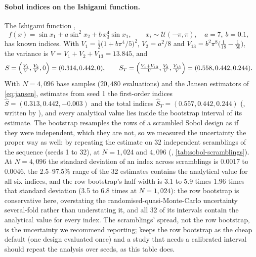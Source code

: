\paragraph{Sobol indices on the Ishigami function.} The Ishigami function
\citep{ishigami1990importance},
\begin{equation}
  f(x) = \sin x_1 + a \sin^2 x_2 + b\, x_3^4 \sin x_1, \qquad x_i \sim
  \mathcal{U}(-\pi, \pi), \quad a = 7,\ b = 0.1,
\end{equation}
has known indices. With $V_1 = \tfrac12\bigl(1 + b\pi^4/5\bigr)^2$, $V_2 = a^2/8$ and
$V_{13} = b^2\pi^8\bigl(\tfrac{1}{18} - \tfrac{1}{50}\bigr)$, the variance is $V = V_1 + V_2 +
V_{13} = 13.845$, and
\begin{equation}
  S = \Bigl(\tfrac{V_1}{V}, \tfrac{V_2}{V}, 0\Bigr) = (0.314, 0.442, 0), \qquad
  S_T = \Bigl(\tfrac{V_1 + V_{13}}{V}, \tfrac{V_2}{V}, \tfrac{V_{13}}{V}\Bigr)
  = (0.558, 0.442, 0.244).
\end{equation}
With $N = 4{,}096$ base samples ($20{,}480$ evaluations) and the Jansen estimators of
\cref{eq:jansen}, \modelly{} estimates from seed 1 the first-order indices
$\hat S = (0.313, 0.442, -0.003)$ and the total indices $\hat S_T = (0.557, 0.442, 0.244)$ (, written by
), and every analytical value lies inside the bootstrap
interval of its estimate. The bootstrap resamples the rows of a scrambled Sobol design as
if they were independent, which they are not, so we measured the uncertainty the proper
way as well: by repeating the estimate on 32 independent scramblings of the sequence
(seeds 1 to 32), at $N = 1{,}024$ and $4{,}096$ (,
\cref{tab:sobol-scramblings}). At $N = 4{,}096$ the standard deviation of an index across
scramblings is 0.0017 to 0.0046, the 2.5--97.5\% range of the 32 estimates contains the
analytical value for all six indices, and the row bootstrap's half-width is 3.1 to 5.9
times $1.96$ times that standard deviation (3.5 to 6.8 times at $N = 1{,}024$): the row
bootstrap is conservative here, overstating the randomised-quasi-Monte-Carlo uncertainty
several-fold rather than understating it, and all 32 of its intervals contain the
analytical value for every index. The scramblings' spread, not the row bootstrap, is the
uncertainty we recommend reporting; \modelly{} keeps the row bootstrap as the cheap
default (one design evaluated once) and a study that needs a calibrated interval should
repeat the analysis over seeds, as this table does.

